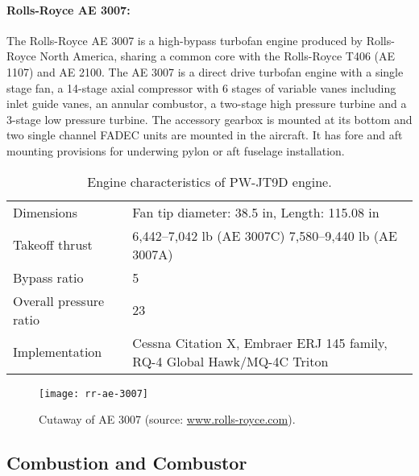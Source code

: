 \paragraph{Rolls-Royce AE 3007:}
The Rolls-Royce AE 3007 is a high-bypass turbofan engine produced by Rolls-Royce North America, sharing a common core with the Rolls-Royce T406 (AE 1107) and AE 2100. The AE 3007 is a direct drive turbofan engine with a single stage fan, a 14-stage axial compressor with 6 stages of variable vanes including inlet guide vanes, an annular combustor, a two-stage high pressure turbine and a 3-stage low pressure turbine. The accessory gearbox is mounted at its bottom and two single channel FADEC units are mounted in the aircraft. It has fore and aft mounting provisions for underwing pylon or aft fuselage installation.
\begin{table}[!htb!]
  \centering
\begin{tabular}{|p{}|p{}|}\hline
Dimensions & Fan tip diameter: 38.5 in, Length: 115.08 in\\
Takeoff thrust & 6,442--7,042 lb (AE 3007C) 7,580--9,440 lb (AE 3007A)\\
Bypass ratio & 5\\
Overall pressure ratio& 23\\
Implementation& Cessna Citation X,  Embraer ERJ 145 family, RQ-4 Global Hawk/MQ-4C Triton\\\hline
\end{tabular}
  \caption{\label{TAB_JT9D}Engine characteristics of PW-JT9D engine.}
\end{table}

\begin{figure}[!htb!]
 \centering
    {\texttt{[image: rr-ae-3007]}}
    \caption{\label{FIG_AE3007}Cutaway of AE 3007 (source: \url{www.rolls-royce.com}).}
\end{figure}

\subsection{Combustion and Combustor}

